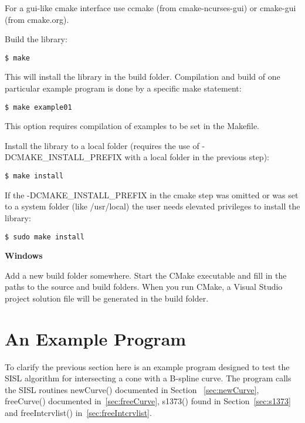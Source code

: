 For a gui-like cmake interface use ccmake (from cmake-ncurses-gui) or cmake-gui (from cmake.org).

Build the library:
\begin{verbatim}
$ make
\end{verbatim}
This will install the library in the build folder. Compilation and build of one particular
example program is done by a specific make statement:
\begin{verbatim}
$ make example01
\end{verbatim}
This option requires compilation of examples to be set in the Makefile.

Install the library to a local folder (requires the use of
-DCMAKE\_INSTALL\_PREFIX with a local folder in the previous step):
\begin{verbatim}
$ make install
\end{verbatim}

If the -DCMAKE\_INSTALL\_PREFIX in the cmake step was omitted or was set to a
system folder (like /usr/local) the user needs elevated privileges to install
the library:
\begin{verbatim}
$ sudo make install
\end{verbatim}

\medskip
{\noindent \bf Windows}

Add a new build folder somewhere. Start the CMake
executable and fill in the paths to the source and build folders. When
you run CMake, a Visual Studio project solution file will be generated
in the build folder.



\newpage
\section{An Example Program} \label{sec:exampleprog}

To clarify the previous section here is an example program designed to
test the SISL algorithm for intersecting a cone with
a B-spline curve. The program calls the SISL routines newCurve() documented in
Section ~\ref{sec:newCurve}, freeCurve() documented in~\ref{sec:freeCurve},
s1373() found in Section~\ref{sec:s1373} and freeIntcrvlist() in~\ref{sec:freeIntcrvlist}.

